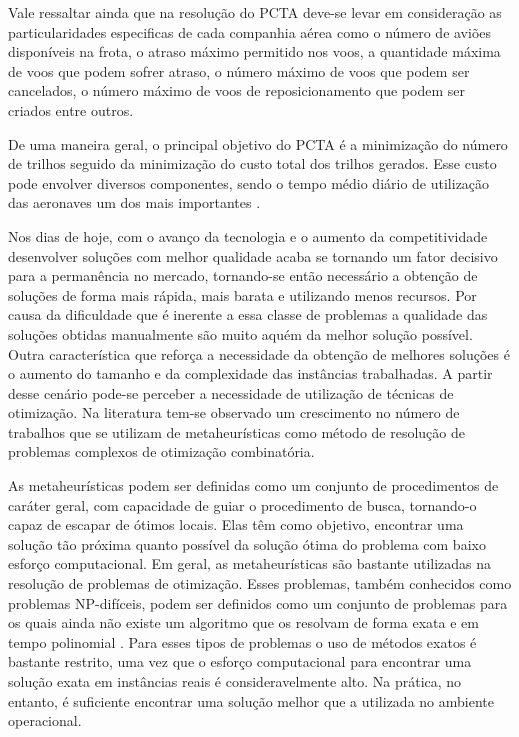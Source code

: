 	Vale ressaltar ainda que na resolução do PCTA deve-se levar em consideração as particularidades especificas de cada companhia aérea como o número de aviões disponíveis na frota, o atraso máximo permitido nos voos, a quantidade máxima de voos que podem sofrer atraso, o número máximo de voos que podem ser cancelados, o número máximo de voos de reposicionamento que podem ser criados entre outros.
	
	De uma maneira geral, o principal objetivo do PCTA é a minimização do número de trilhos seguido da minimização do custo total dos trilhos gerados. Esse custo pode envolver diversos componentes, sendo o tempo médio diário de utilização das aeronaves um dos mais importantes \citep{abiliolivro}.
  
  
	 Nos dias de hoje, com o avanço da tecnologia e o aumento da competitividade desenvolver soluções com melhor qualidade acaba se tornando um fator decisivo para a permanência no mercado, tornando-se então necessário a obtenção de soluções de forma mais rápida, mais barata e utilizando menos recursos. Por causa da dificuldade que é inerente a essa classe de problemas a qualidade das soluções obtidas manualmente são muito aquém da melhor solução possível. Outra  característica que reforça a necessidade da obtenção de melhores soluções é o aumento do tamanho e da complexidade das instâncias trabalhadas. A partir desse cenário pode-se perceber a necessidade de utilização de técnicas de otimização. Na literatura tem-se observado um crescimento no número de trabalhos que se utilizam de metaheurísticas como método de resolução de problemas complexos de otimização combinatória.	  
  
	As metaheurísticas podem ser definidas como um conjunto de procedimentos de caráter geral, com capacidade de guiar o procedimento de busca, tornando-o capaz de escapar de ótimos locais. Elas têm como objetivo, encontrar uma solução tão próxima quanto possível da solução ótima do problema com baixo esforço computacional. Em geral, as metaheurísticas são bastante utilizadas na resolução de problemas de otimização. Esses problemas, também conhecidos como problemas NP-difíceis, podem ser definidos como um conjunto de problemas para os quais ainda não existe um algoritmo que os resolvam de forma exata e em tempo polinomial \citep{maritan2009}. Para esses tipos de problemas o uso de métodos exatos é bastante restrito, uma vez que o esforço computacional para encontrar uma solução exata em instâncias reais é consideravelmente alto. Na prática, no entanto, é suficiente encontrar uma solução melhor que a utilizada no ambiente operacional. 


